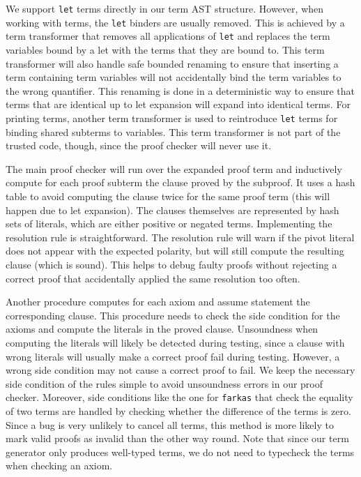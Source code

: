 \documentclass[a4paper]{easychair}
\newcommand\smtlib[1]{\texttt{#1}}
\begin{document}
We support \smtlib{let} terms directly in our term AST structure.
However, when working with terms, the \smtlib{let} binders are usually removed.
This is achieved by a term transformer that removes all applications of \smtlib{let} and replaces the term variables bound by a let with the terms that they are bound to.
This term transformer will also handle safe bounded renaming to ensure that inserting a term containing term variables will not accidentally bind the term variables to the wrong quantifier.
This renaming is done in a deterministic way to ensure that terms that are identical up to let expansion will expand into identical terms.
For printing terms, another term transformer is used to reintroduce \smtlib{let} terms for binding shared subterms to variables.
This term transformer is not part of the trusted code, though, since the proof checker will never use it.

The main proof checker will run over the expanded proof term and inductively compute for each proof subterm the clause proved by the subproof.
It uses a hash table to avoid computing the clause twice for the same proof term (this will happen due to let expansion).
The clauses themselves are represented by hash sets of literals, which are either positive or negated terms.
Implementing the resolution rule is straightforward.
The resolution rule will warn if the pivot literal does not appear with the expected polarity, but will still compute the resulting clause (which is sound).
This helps to debug faulty proofs without rejecting a correct proof that accidentally applied the same resolution too often.

Another procedure computes for each axiom and assume statement the corresponding clause.
This procedure needs to check the side condition for the axioms and compute the literals in the proved clause.
Unsoundness when computing the literals will likely be detected during testing, since a clause with wrong literals will usually make a correct proof fail during testing.
However, a wrong side condition may not cause a correct proof to fail.
We keep the necessary side condition of the rules simple to avoid unsoundness errors in our proof checker.
Moreover, side conditions like the one for \smtlib{farkas} that check the equality of two terms are handled by checking whether the difference of the terms is zero.
Since a bug is very unlikely to cancel all terms, this method is more likely to mark valid proofs as invalid than the other way round.
Note that since our term generator only produces well-typed terms, we do not need to typecheck the terms when checking an axiom.
\end{document}
